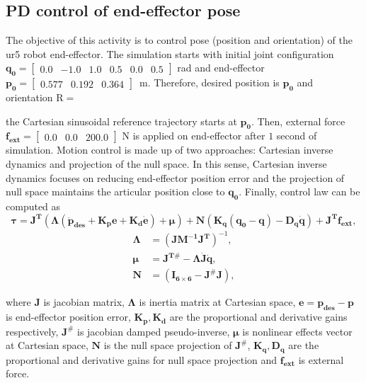 \graphicspath{{images/act_3.1/}}
\subsection{PD control of end-effector pose}
The objective of this activity is to control pose (position and orientation) of the ur5 robot end-effector. The simulation starts with initial joint configuration $\mathbf{q_0}=\begin{bmatrix} 0.0 & -1.0 & 1.0 & 0.5 & 0.0 & 0.5 \end{bmatrix}$ rad and end-effector $\mathbf{p_0}=\begin{bmatrix}  0.577 &   0.192 &   0.364 \end{bmatrix}$~m. Therefore, desired position is $\mathbf{p_0}$ and orientation $\mathrm{R} = $ 

the Cartesian sinusoidal reference trajectory starts at $\mathbf{p_0}$. Then, external force $\mathbf{f_{ext}}=\begin{bmatrix} 0.0 & 0.0 & 200.0\end{bmatrix}$ N is applied on end-effector after $1$ second of simulation. Motion control is made up of two approaches: Cartesian inverse dynamics and projection of the null space. In this sense, Cartesian inverse dynamics focuses on reducing end-effector position error and the projection of null space maintains the articular position close to $\mathbf{q_0}$. Finally, control law can be computed as 
\begin{equation}
	\boldsymbol{\tau}
	= \mathbf{J^T} (\boldsymbol{\Lambda}( \mathbf{\ddot{p}_{des}} + \mathbf{K_p e} + \mathbf{K_d \dot{e}}) + \boldsymbol{\mu})+ \mathbf{N} \left(\mathbf{K_q(q_0-q) - D_q \dot{q}} \right) + \mathbf{J^T}\mathbf{f_{ext}} ,
	\label{eq:cartesian_idyn_N_f_ext}
\end{equation} 
\begin{align*}
	\boldsymbol{\Lambda} &= (\mathbf{J M^{-1} J^{T}})^{-1}, \\
	\boldsymbol{\mu} &= \mathbf{J^{T\#}} - \boldsymbol{\Lambda}\mathbf{\dot{J}\dot{q}}, \\
	\mathbf{N} &=(\mathbf{I_{6 \times 6}} - \mathbf{J^{\#} J} ),
\end{align*}

\noindent where $\mathbf{J}$ is jacobian matrix, $\boldsymbol{\Lambda}$ is inertia matrix at Cartesian space, $\mathbf{e}=\mathbf{p_{des} - p}$ is end-effector position error, $\mathbf{K_p, K_d}$ are the proportional and derivative gains respectively, $\mathbf{J^{\#}}$ is jacobian damped pseudo-inverse, $\boldsymbol{\mu}$ is nonlinear effects vector at Cartesian space, $\mathbf{N}$ is the null space projection of $\mathbf{J^{\#}}$, $\mathbf{K_q, D_q}$ are the proportional and derivative gains for null space projection and $\mathbf{f_{ext}}$ is external force. \vspace{.5cm}
